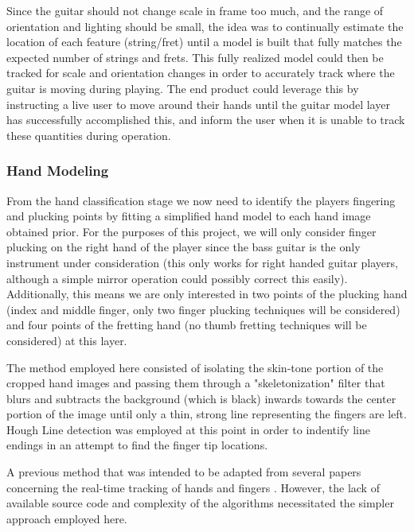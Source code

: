 Since the guitar should not change scale in frame too much, and the range of orientation
and lighting should be small, the idea was to continually estimate the location of each feature
(string/fret) until a model is built that fully matches the expected number of strings and frets.
This fully realized model could then be tracked for scale and orientation changes in order to
accurately track where the guitar is moving during playing.
The end product could leverage this by instructing a live user to move around their hands until
the guitar model layer has successfully accomplished this, and inform the user when it is unable
to track these quantities during operation.

\subsubsection{Hand Modeling}
From the hand classification stage we now need to identify the players fingering and plucking points
by fitting a simplified hand model to each hand image obtained prior.
For the purposes of this project, we will only consider finger plucking on the right hand of the player
since the bass guitar is the only instrument under consideration
(this only works for right handed guitar players, although a simple mirror operation could possibly correct this easily).
Additionally, this means we are only interested in two points of the plucking hand
(index and middle finger, only two finger plucking techniques will be considered)
and four points of the fretting hand (no thumb fretting techniques will be considered) at this layer.
\par
The method employed here consisted of isolating the skin-tone portion of the cropped hand images \cite{pyimagesearch,seereality}
and passing them through a "skeletonization" filter \cite{skeleton} that blurs and subtracts the background (which is black)
inwards towards the center portion of the image until only a thin, strong line representing the fingers are left.
Hough Line detection was employed at this point in order to indentify line endings in an attempt to find the finger tip locations.
\par
A previous method that was intended to be adapted from several papers concerning the real-time tracking of hands and fingers
\cite{aslhand,handposes,fingertracking}.
However, the lack of available source code and complexity of the algorithms necessitated the simpler approach employed here.

